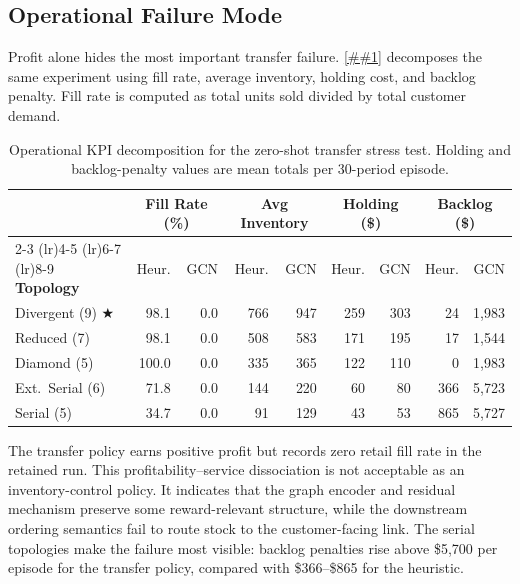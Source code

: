 \documentclass[10pt,a4paper]{article}
\providecommand{\Cref}[1]{\ref{##1}}
\begin{document}
\subsection{Operational Failure Mode}

Profit alone hides the most important transfer failure.
\Cref{tab:transfer_kpis} decomposes the same experiment using fill
rate, average inventory, holding cost, and backlog penalty.  Fill rate
is computed as total units sold divided by total customer demand.

\begin{table}[!htbp]
\centering
\caption[Operational KPI decomposition for topology transfer.]{%
  Operational KPI decomposition for the zero-shot transfer stress test.
  Holding and backlog-penalty values are mean totals per 30-period episode.}
\label{tab:transfer_kpis}
\small
\renewcommand{\arraystretch}{1.05}
\begin{tabular}{@{} l rr rr rr rr @{}}
\toprule
& \multicolumn{2}{c}{\textbf{Fill Rate (\%)}}
& \multicolumn{2}{c}{\textbf{Avg Inventory}}
& \multicolumn{2}{c}{\textbf{Holding (\$)}}
& \multicolumn{2}{c}{\textbf{Backlog (\$)}} \\
\cmidrule(lr){2-3} \cmidrule(lr){4-5} \cmidrule(lr){6-7} \cmidrule(lr){8-9}
\textbf{Topology} & Heur. & GCN & Heur. & GCN & Heur. & GCN & Heur. & GCN \\
\midrule
\rowcolor{lightgray}
Divergent (9) $\bigstar$
  & 98.1 &  0.0 &  766 &  947 &  259 & 303 &    24 & 1{,}983 \\
Reduced (7)
  & 98.1 &  0.0 &  508 &  583 &  171 & 195 &    17 & 1{,}544 \\
\rowcolor{lightgray}
Diamond (5)
  & 100.0 & 0.0 &  335 &  365 &  122 & 110 &     0 & 1{,}983 \\
Ext.\ Serial (6)
  & 71.8 &  0.0 &  144 &  220 &   60 &  80 &   366 & 5{,}723 \\
\rowcolor{lightgray}
Serial (5)
  & 34.7 &  0.0 &   91 &  129 &   43 &  53 &   865 & 5{,}727 \\
\bottomrule
\end{tabular}
\end{table}

The transfer policy earns positive profit but records zero retail fill
rate in the retained run.  This profitability--service dissociation is
not acceptable as an inventory-control policy.  It indicates that the
graph encoder and residual mechanism preserve some reward-relevant
structure, while the downstream ordering semantics fail to route stock
to the customer-facing link.  The serial topologies make the failure
most visible: backlog penalties rise above \$5{,}700 per episode for
the transfer policy, compared with \$366--\$865 for the heuristic.
\end{document}
